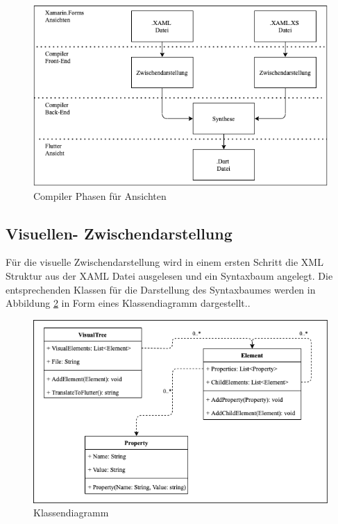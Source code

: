 \begin{figure}[!ht]
 \includegraphics[width=\textwidth,keepaspectratio]{Images/Implementation/ViewCompiler.png}
 \caption{Compiler Phasen für Ansichten}
 \label{fig:ViewCompilerPhases}
\end{figure}

\subsection{Visuellen- Zwischendarstellung}

Für die visuelle Zwischendarstellung wird in einem ersten Schritt die XML Struktur
aus der XAML Datei ausgelesen und ein Syntaxbaum angelegt.  Die entsprechenden Klassen für die Darstellung des Syntaxbaumes werden in Abbildung \ref{fig:Klassendiagram} in Form eines Klassendiagramm dargestellt..

\begin{figure}[!ht]
 \includegraphics[width=\textwidth,keepaspectratio]{Images/Implementation/Klassendiagram.png}
 \caption{Klassendiagramm}
 \label{fig:Klassendiagram}
\end{figure}

